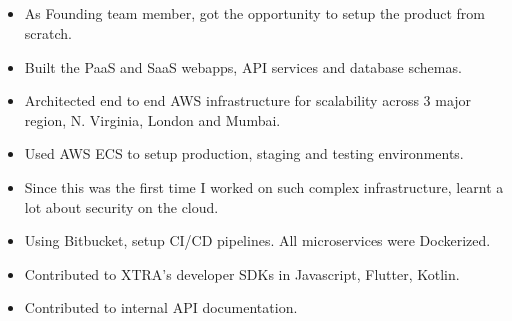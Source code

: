 \documentclass[10pt,a4paper]{altacv}
\begin{document}

\makecvheader

\\

\divider\smallskip

\\

\divider\smallskip

\\

\divider\smallskip

\\


\begin{itemize}
\item As Founding team member, got the opportunity to setup the product from scratch.
\item Built the PaaS and SaaS webapps, API services and database schemas.
\item Architected end to end AWS infrastructure for scalability across 3 major region, N. Virginia, London and Mumbai.
\item Used AWS ECS to setup production, staging and testing environments.
\item Since this was the first time I worked on such complex infrastructure, learnt a lot about security on the cloud.
\item Using Bitbucket, setup CI/CD pipelines. All microservices were Dockerized.
\item Contributed to XTRA's developer SDKs in Javascript, Flutter, Kotlin.
\item Contributed to internal API documentation.
\end{itemize}
\end{document}
